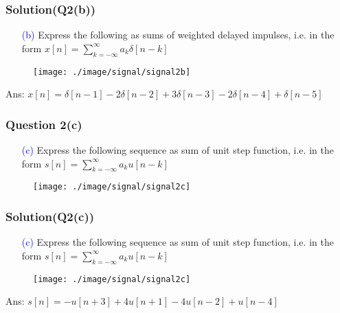 \documentclass{beamer}
\newcommand{\blue}[1]{\textcolor{blue}{#1}}
\begin{document}
\begin{frame}
\frametitle{Solution(Q2(b))}

\begin{itemize} \itemsep6pt \parskip0pt 
  \item[\blue{(b)}] Express the following as sums of weighted delayed impulses, \newline i.e. in the form $x[n] = \sum_{k = -\infty}^{\infty}a_k\delta[n-k]$
\end{itemize}


\begin{figure}[H]
  \centering
  \texttt{[image: ./image/signal/signal2b]}
\end{figure}

\centerline{Ans: $x[n] = \delta[n-1] - 2\delta[n-2] + 3\delta[n-3] - 2\delta[n-4] + \delta[n-5]$}
\end{frame}


\begin{frame}
\frametitle{Question 2(c)}

\begin{itemize} \itemsep6pt \parskip0pt 
  \item[\blue{(c)}] Express the following sequence as sum of unit step function, \newline i.e. in the form $s[n] = \sum_{k = -\infty}^{\infty}a_ku[n-k]$
\end{itemize}

\begin{figure}[H]
  \centering
  \texttt{[image: ./image/signal/signal2c]}
\end{figure}

\end{frame}


\begin{frame}
\frametitle{Solution(Q2(c))}

\begin{itemize} \itemsep6pt \parskip0pt 
  \item[\blue{(c)}] Express the following sequence as sum of unit step function, \newline i.e. in the form $s[n] = \sum_{k = -\infty}^{\infty}a_ku[n-k]$
\end{itemize}


\begin{figure}[H]
  \centering
  \texttt{[image: ./image/signal/signal2c]}
\end{figure}

\centerline{Ans: $s[n] = -u[n+3] + 4u[n+1] - 4u[n-2] + u[n-4]$}
\end{frame}
\end{document}
